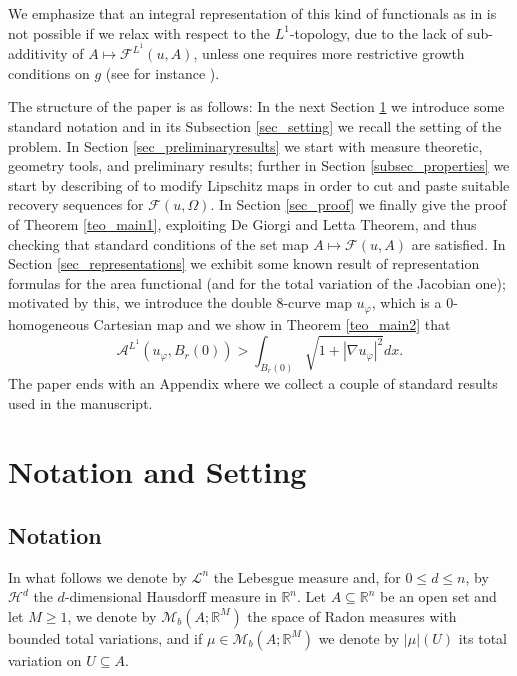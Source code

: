 \documentclass[a4paper,11pt]{article}
\numberwithin{equation}{section}
\newcommand{\Om}{\Omega}
\newcommand{\R}{\mathbb{R}}
\begin{document}
We emphasize that an integral representation of this kind of functionals as in \cite{DalMaso:80} is not possible if we relax with respect to the $L^1$-topology, due to the lack of sub-additivity of $A\mapsto \mathcal F^{L^1}(u,A)$, unless one requires more restrictive growth conditions on $g$ (see for instance \cite{Fons1,Fons2,soneji}).


The structure of the paper is as follows: In the next Section \ref{sec_notation} we introduce some standard notation and in its Subsection \ref{sec_setting} we recall the setting of the problem. In Section \ref{sec_preliminaryresults} we start with measure theoretic, geometry tools, and preliminary results; further in Section \ref{subsec_properties} we start by describing of to modify Lipschitz maps in order to cut and paste suitable recovery sequences for $\mathcal F(u,\Om)$.
In Section \ref{sec_proof} we finally give the proof of Theorem \ref{teo_main1}, exploiting De Giorgi and Letta Theorem, and thus checking that standard conditions of the set map $A\mapsto \mathcal F(u,A)$ are satisfied. In Section \ref{sec_representations} we exhibit some known result of representation formulas for the area functional (and for the total variation of the Jacobian one); motivated by this, we introduce the double $8$-curve map $u_\varphi$, which is a $0$-homogeneous Cartesian map and we show in Theorem \ref{teo_main2} that $$\mathcal A^{L^1}(u_\varphi,B_r(0))>\int_{B_r(0)}\sqrt{1+|\nabla u_\varphi|^2}dx.$$
The paper ends with an Appendix where we collect a couple of standard results used in the manuscript.






\section{Notation and Setting}\label{sec_notation}

\subsection{Notation}

In what follows we denote by $\mathcal L^n$ the Lebesgue measure  and, for $0\leq d\leq n$, by $\mathcal H^{d}$ the $d$-dimensional Hausdorff measure in $\R^n$. 
Let $A\subseteq\R^n$ be an open set and let $M\geq 1$, we denote by $\mathcal M_b(A;\R^M)$ the space of Radon measures with bounded total variations, and if $\mu\in \mathcal M_b(A;\R^M)$ we denote by $|\mu|(U)$ its total variation on $U\subseteq A$.
\medskip
\end{document}
